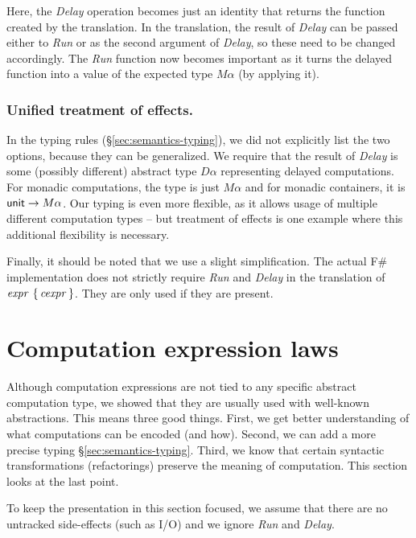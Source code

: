 \documentclass[runningheads,a4paper]{llncs}
\begin{document}
%
Here, the \emph{Delay} operation becomes just an identity that returns the function created by the
translation. In the translation, the result of \emph{Delay} can be passed either to \emph{Run}
or as the second argument of \emph{Delay}, so these need to be changed accordingly. The \emph{Run}
function now becomes important as it turns the delayed function into a value of the expected
type $M\alpha$ (by applying it).

\vspace{-1em}
\subsubsection{Unified treatment of effects.} In the typing rules (\S\ref{sec:semantics-typing}), 
we did not explicitly list the two options, because they can be generalized. We require that the
result of \emph{Delay} is some (possibly different) abstract type $D\alpha$ representing delayed
computations. For monadic computations, the type is just $M\alpha$ and for monadic containers,
it is $\textnormal{\sffamily unit} \rightarrow M\alpha$. Our typing is even more flexible, as it allows usage of 
multiple different computation types -- but treatment of effects is one example where this
additional flexibility is necessary.

Finally, it should be noted that we use a slight simplification. The actual F\# implementation 
does not strictly require \emph{Run} and \emph{Delay} in the translation of $\textnormal{\emph{expr}}~\{\,\textnormal{\emph{cexpr}}\,\}$. 
They are only used if they are present. 



\section{Computation expression laws}
\label{sec:laws}

Although computation expressions are not tied to any specific abstract computation type, we 
showed that they are usually used with well-known abstractions.
This means three good things. First, we get better understanding of what computations can be encoded
(and how). Second, we can add a more precise typing \S\ref{sec:semantics-typing}. Third, we know
that certain syntactic transformations (refactorings) preserve the meaning of computation. This
section looks at the last point. 

To keep the presentation in this section focused, we assume that there are no untracked side-effects 
(such as I/O) and we ignore \emph{Run} and \emph{Delay}.
\end{document}
